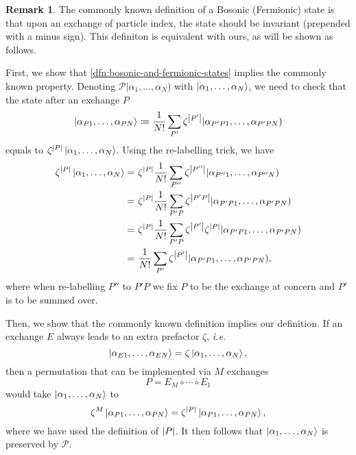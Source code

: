 \documentclass{article}
\theoremstyle{definition}
\newtheorem{rem}{Remark}[section]
\theoremstyle{plain}
\numberwithin{equation}{section}
\begin{document}
\begin{rem}
    \label{rem:equivalence-to-commonly-known-dfn}
    The commonly known definition of a Bosonic (Fermionic) 
    state is that upon an exchange of particle index, 
    the state should be invariant (prepended with a minus sign). 
    This definiton is equivalent with ours, 
    as will be shown as follows. 

    First, we show that 
    \cref{dfn:bosonic-and-fermionic-states} 
    implies the commonly known property. 
    Denoting $\mathcal{P} |\alpha_1, \ldots ,\alpha_{N})$ with 
    $\ket{\alpha_1, \ldots ,\alpha_{N}}$, 
    we need to check that the state 
    after an exchange $P$ 
    \[
    \ket{\alpha_{P1}, \ldots ,\alpha_{PN}} 
    \coloneqq    
    \frac{1}{N!}
        \sum_{P'}
        \zeta^{\abs{P'}}
        |\alpha_{P'P1}, \ldots ,\alpha_{P'PN})
    \]
    equals to 
    $\zeta^{\abs{P}}\ket{\alpha_1, \ldots ,\alpha_{N}}$.
    Using the re-labelling trick, we have
    \begin{align*}
        \zeta^{\abs{P}}\ket{\alpha_1, \ldots ,\alpha_{N}}
        =&\ 
        \zeta^{\abs{P}}\frac{1}{N!}\sum_{P''}
        \zeta^{\abs{P''}}
        |\alpha_{P''1}, \ldots ,\alpha_{P''N}) \\
        =&\ 
        \zeta^{\abs{P}}\frac{1}{N!}\sum_{P'P}\zeta^{\abs{P'P}}
        |\alpha_{P'P1}, \ldots ,\alpha_{P'PN}) \\
        =&\ 
        \zeta^{\abs{P}}\frac{1}{N!}\sum_{P'P}
        \zeta^{\abs{P'}}\zeta^{\abs{P}}
        |\alpha_{P'P1}, \ldots ,\alpha_{P'P N}) \\
        =&\ 
        \frac{1}{N!}
        \sum_{P'}\zeta^{\abs{P'}}
        |\alpha_{P'P1}, \ldots ,\alpha_{P'P N}),
    \end{align*}
    where when re-labelling $P''$ to $P'P$ we 
    fix $P$ to be the exchange at concern and 
    $P'$ is to be summed over.

    Then, we show that the commonly known definition 
    implies our definition. If an exchange $E$ always 
    leads to an extra prefactor $\zeta$, \textit{i.e.}
    \[
        \ket{\alpha_{E 1}, \ldots ,\alpha_{EN}}
        =
        \zeta \ket{\alpha_1, \ldots ,\alpha_{N}},
    \]
    then a permutation 
    that can be implemented via $M$ exchanges
    \[
        P = E_{M} \circ \cdots \circ E_1
    \]
    would take 
    $\ket{\alpha_{1}, \ldots ,\alpha_{N}}$ to 
    \[
        \zeta^{M} \ket{\alpha_{P 1}, \ldots ,\alpha_{PN}}
        =
        \zeta^{\abs{P}}
        \ket{\alpha_{P 1}, \ldots ,\alpha_{PN}},
    \]
    where we have used the definition of $\abs{P}$. 
    It then follows that $\ket{\alpha_1, \ldots ,\alpha_{N}}$ 
    is preserved by $\mathcal{P}$.
\end{rem}
\end{document}
